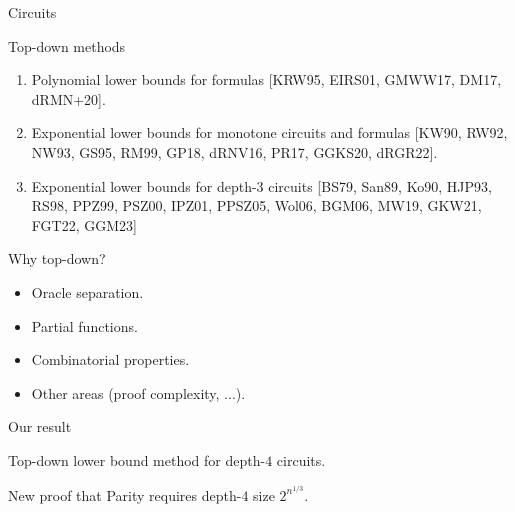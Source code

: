\begin{frame}{Circuits}

\end{frame}


\begin{frame}{Top-down methods}

    \begin{enumerate}
        \item Polynomial lower bounds for formulas [KRW95, EIRS01, GMWW17, DM17, dRMN+20].
        \item Exponential lower bounds for monotone circuits and formulas [KW90, RW92, NW93, GS95, RM99,
            GP18, dRNV16, PR17, GGKS20, dRGR22].
        \item Exponential lower bounds for depth-$3$ circuits [BS79, San89, Ko90, HJP93, RS98, PPZ99,
            PSZ00, IPZ01, PPSZ05, Wol06, BGM06, MW19, GKW21, FGT22, GGM23]
    \end{enumerate}
\end{frame}


\begin{frame}{Why top-down?}

    \begin{itemize}
        \item Oracle separation.
            \pause
        \item Partial functions.
            \pause
        \item Combinatorial properties.
            \pause
        \item Other areas (proof complexity, ...).
    \end{itemize}
\end{frame}




\begin{frame}{Our result}

    \begin{block}{}
        \begin{center}
            Top-down lower bound method for depth-$4$ circuits.

            \vspace{0.2cm}
            
            New proof that Parity requires depth-$4$ size $2^{n^{1/3}}$.            
        \end{center}
    \end{block}
\end{frame}